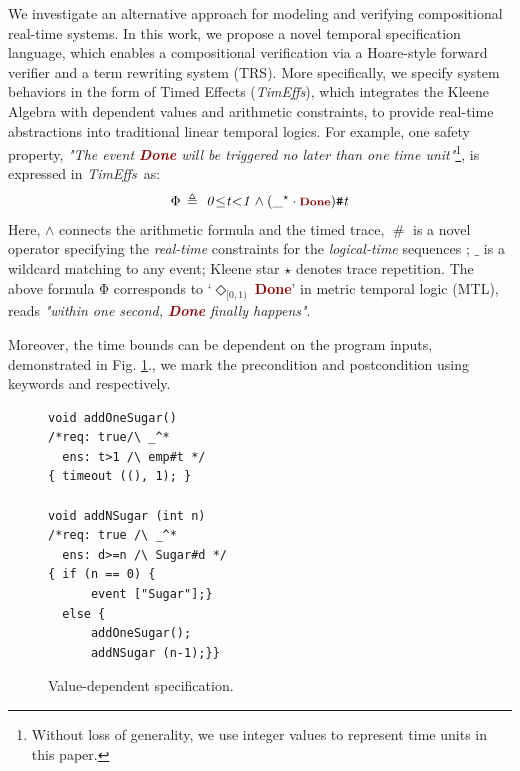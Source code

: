 \documentclass[acmsmall,10pt,review]{acmart}
\newcommand{\timedEffects}{\emph{TimEffs}}
\newcommand{\effect}{{\ensuremath{\mathrm{\Phi}}}}
\newcommand{\anyevent}[1]{{\textcolor{darkred}
{{\textbf{\footnotesize #1}}}}}
\newcommand{\code}[1]{{\tt{\ensuremath{\m{#1}}}}}
\newcommand{\m}{\mathit}
\newcommand{\mysharp}{{\mathrel{\texttt{\#}}}}
\def\defeq{\ensuremath{\,\triangleq}}
\newcommand\figref[1]{Fig. \textcolor{black}{\ref{#1}}.}
\begin{document}
We investigate an alternative approach for modeling and verifying 
compositional real-time systems. In this work, 
we propose a novel temporal specification language, 
which enables a compositional verification via a  Hoare-style 
forward verifier and a term rewriting system (TRS). 
More specifically, we specify system behaviors in the form of 
{Timed Effects} (\timedEffects), which integrates the Kleene Algebra 
with dependent values and arithmetic constraints, 
to 
provide real-time abstractions into traditional linear temporal logics. 
For example, one safety property, \textit{"The event \anyevent{Done} 
will be triggered no later than one time unit"}\footnote{Without loss of generality, 
we use integer values to represent time units in this 
paper.%
}, is expressed in \timedEffects\ as: 
\begin{align*}
  \code{\effect \defeq \  0 {\leq} t {<}1 \wedge ({\_^\star} \cdot \anyevent{Done} ) \mysharp  t}
\end{align*}  
Here, \code{\wedge} connects the arithmetic formula and the timed trace, \code{\mysharp } is a novel operator specifying the \emph{real-time} 
constraints for the \emph{logical-time} sequences \cite{DBLP:conf/fdl/HanxledenBG17}; 
\code{\_} is a wildcard matching to any event; 
Kleene star \code{\star} denotes trace repetition.
The above formula \code{\effect} corresponds to `\code{\Diamond_{[0, 1)}\ }\anyevent{Done}' 
in metric temporal logic (MTL), reads \textit{"within one second, 
\anyevent{Done} finally happens"}. 

Moreover, the time bounds 
can be dependent on the program inputs, demonstrated in \figref{fig:Value_dependent_intro}, we mark the precondition and postcondition
using keywords {\color{darklavender}\code{\emph{req:}}} and {\color{darklavender}\code{\emph{ens:}}} respectively. 


\begin{figure}
\begin{lstlisting}[name=coffee]
void addOneSugar() 
/*req: true/\ _^*
  ens: t>1 /\ emp#t */ 
{ timeout ((), 1); }

void addNSugar (int n) 
/*req: true /\ _^*
  ens: d>=n /\ Sugar#d */
{ if (n == 0) { 
      event ["Sugar"];} 
  else {
      addOneSugar();
      addNSugar (n-1);}} 
\end{lstlisting}
\caption{Value-dependent specification.} 
\label{fig:Value_dependent_intro}
\vspace{0mm}
\end{figure}
\end{document}
